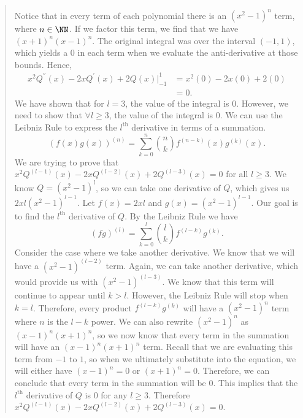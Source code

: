 \documentclass{hw}
\begin{document}
\begin{enumerate}
\begin{quote}
\begin{align*}
\end{align*}
Notice that in every term of each polynomial there is an $(x^2-1)^n$ term, where $n\in\NN$. If we factor
this term, we find that we have $(x+1)^n(x-1)^n$. The original integral was over the interval $(-1,1)$,
which yields a 0 in each term when we evaluate the anti-derivative at those bounds. Hence,
\begin{align*}
x^2Q^{''}(x) - 2xQ^{'}(x) + 2Q(x)\Big|_{-1}^{1} &= x^2(0)-2x(0)+2(0)\\
&= 0.
\end{align*}
We have shown that for $l=3$, the value of the integral is 0. However, we need to show that
$\forall l\geq3$, the value of the integral is 0. We can use the Leibniz Rule to express the
$l^{\text{th}}$ derivative in terms of a summation.
\[
(f(x)g(x))^{(n)} = \sum_{k=0}^{n}{n\choose k}f^{(n-k)}(x)g^{(k)}(x).
\]
We are trying to prove that $x^2Q^{(l-1)}(x) - 2xQ^{(l-2)}(x) + 2Q^{(l-3)}(x) = 0$ for all $l\geq3$.
We know $Q=(x^2-1)^l$, so we can take one derivative of $Q$, which gives us $2xl(x^2-1)^{l-1}$. Let
$f(x)=2xl$ and $g(x)=(x^2-1)^{l-1}$. Our goal is to find the $l^{\text{th}}$ derivative of $Q$.
By the Leibniz Rule we have
\[
(fg)^{(l)} = \sum_{k=0}^{l}{l\choose k}f^{(l-k)}g^{(k)}.
\]
Consider the case where we take another derivative. We know that we will have a $(x^2-1)^{(l-2)}$ term.
Again, we can take another derivative, which would provide us with $(x^2-1)^{(l-3)}$. We know that this
term will continue to appear until $k>l$. However, the Leibniz Rule will stop when $k=l$. Therefore,
every product $f^{(l-k)}g^{(k)}$ will have a $(x^2-1)^{n}$ term where $n$ is the $l-k$ power.
We can also rewrite $(x^2-1)^{n}$ as $(x-1)^n(x+1)^n$, so we now know that every term in the summation
will have an $(x-1)^n(x+1)^n$ term. Recall that we are evaluating this term from $-1$ to $1$, so
when we ultimately substitute into the equation, we will either have $(x-1)^n = 0$ or $(x+1)^n = 0$.
Therefore, we can conclude that every term in the summation will be 0. This implies that the
$l^{\text{th}}$ derivative of $Q$ is 0 for any $l \geq 3$. Therefore
$x^2Q^{(l-1)}(x) - 2xQ^{(l-2)}(x) + 2Q^{(l-3)}(x) = 0$.
\end{quote}



\end{enumerate}
\end{document}
